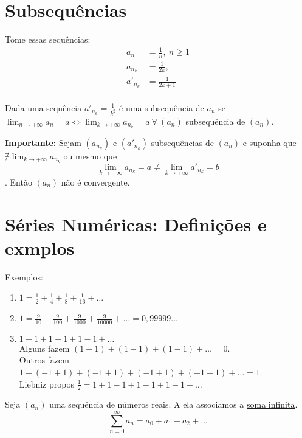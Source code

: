 \documentclass[12pt,openany]{book}
\begin{document}
\section{Subsequências}
\label{sec:s34}
\hspace{5mm} Tome essas sequências:
\begin{align*}
a_n &= \frac{1}{n}, \ n \geq 1 \\
a_{n_k} &= \frac{1}{2k}, \\
a'_{n_k} &= \frac{1}{2k+1} \\
\end{align*}

Dada uma sequência $\displaystyle{a'_{n_k} = \frac{1}{k^2}}$ é uma subsequência de $a_n$ se $\displaystyle{\lim_{n \rightarrow +\infty} a_n = a \Longleftrightarrow \lim_{k \rightarrow +\infty} a_{n_k} = a} \ \forall \ (a_n)$ subsequência de $(a_n)$.

\textbf{Importante: }Sejam $(a_{n_k}) $ e $ (a'_{n_k}) $ subsequências de $(a_n)$ e suponha que $\nexists \lim_{k \rightarrow +\infty} a_{n_k}$ ou mesmo que $$\lim_{k \rightarrow +\infty} a_{n_k} = a \neq \lim_{k \rightarrow +\infty} a'_{n_k} = b $$. Então $(a_n)$ não é convergente.

\section{Séries Numéricas: Definições e exmplos}
\label{sec:s35}
\hspace{5mm} Exemplos:
\begin{enumerate}
\item $\displaystyle{1 = \frac{1}{2} + \frac{1}{4} + \frac{1}{8} + \frac{1}{16} + \hdots}$ \label{ex:351}
\item $\displaystyle{1 = \frac{9}{10} + \frac{9}{100} + \frac{9}{1000} + \frac{9}{10000} + \hdots = 0,99999 \hdots} $ \label{ex:352}
\item $\displaystyle{1 -1 + 1 - 1 + 1 - 1 + \hdots} $ \label{ex:353} \\
Alguns fazem $(1-1) + (1-1) + (1-1) + \hdots = 0$. \\ Outros fazem $1 + (-1 + 1) + (-1 + 1) + (-1 + 1) + (-1 + 1) + \hdots = 1$. \\ Liebniz propos $\frac{1}{2} = 1 + 1 - 1 + 1 - 1 + 1 - 1 + \hdots$ \\
\end{enumerate}

Seja $(a_n)$ uma sequência  de números reais. A ela associamos a \underline{soma infinita}. $$\sum_{n = 0}^{\infty} a_n = a_0 + a_1 + a_2 + \hdots$$
\end{document}
